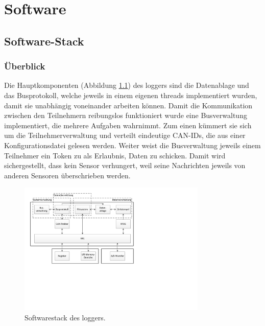 %
%

\chapter{Software}\label{chap.software}

\section{Software-Stack}\label{sec.sw_stack}


\subsection{Überblick}\label{subsec.sw_ueberblick}
Die Hauptkomponenten (Abbildung \ref{fig.swlogger}) des \gls{logger}s sind die Datenablage und das Busprotokoll, welche jeweils in einem eigenen \glspl{thread} implementiert wurden, damit sie unabhängig voneinander arbeiten können. Damit die Kommunikation zwischen den Teilnehmern reibungslos funktioniert wurde eine Busverwaltung implementiert, die mehrere Aufgaben wahrnimmt. Zum einen kümmert sie sich um die Teilnehmerverwaltung und verteilt eindeutige CAN-IDs, die aus einer Konfigurationsdatei gelesen werden. Weiter weist die Busverwaltung jeweils einem Teilnehmer ein Token zu als Erlaubnis, Daten zu schicken. Damit wird sichergestellt, dass kein Sensor verhungert, weil seine Nachrichten jeweils von anderen Sensoren überschrieben werden. 

\begin{figure}
	\centering
		\includegraphics[width=0.8\textwidth]{images/visio/Softwarestack_Logger.pdf}
	\caption{Softwarestack des \gls{logger}s.}
	\label{fig.swlogger}
\end{figure}

